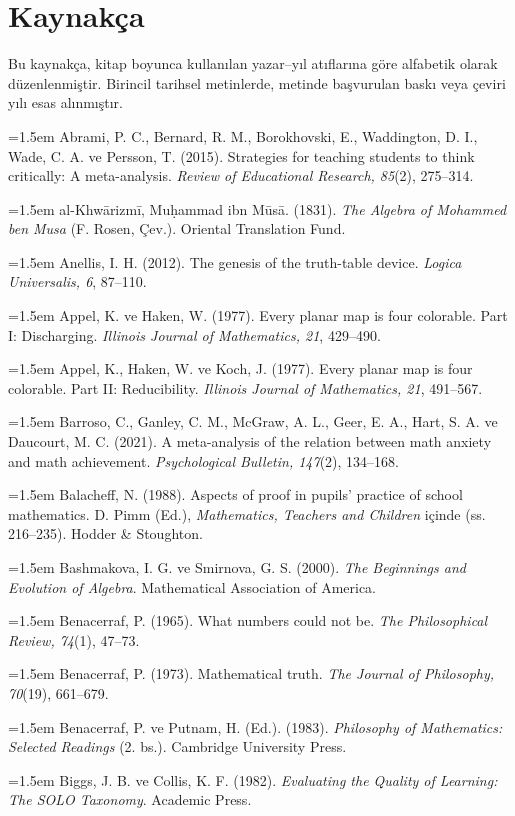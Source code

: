\chapter*{Kaynakça}

Bu kaynakça, kitap boyunca kullanılan yazar--yıl atıflarına göre alfabetik olarak düzenlenmiştir. Birincil tarihsel metinlerde, metinde başvurulan baskı veya çeviri yılı esas alınmıştır.

\begingroup
\small
\newcommand{\refentry}[1]{\par\noindent\hangindent=1.5em #1\par\smallskip}

\refentry{Abrami, P. C., Bernard, R. M., Borokhovski, E., Waddington, D. I., Wade, C. A. ve Persson, T. (2015). Strategies for teaching students to think critically: A meta-analysis. \emph{Review of Educational Research, 85}(2), 275--314.}
\refentry{al-Khwārizmī, Muḥammad ibn Mūsā. (1831). \emph{The Algebra of Mohammed ben Musa} (F. Rosen, Çev.). Oriental Translation Fund.}
\refentry{Anellis, I. H. (2012). The genesis of the truth-table device. \emph{Logica Universalis, 6}, 87--110.}
\refentry{Appel, K. ve Haken, W. (1977). Every planar map is four colorable. Part I: Discharging. \emph{Illinois Journal of Mathematics, 21}, 429--490.}
\refentry{Appel, K., Haken, W. ve Koch, J. (1977). Every planar map is four colorable. Part II: Reducibility. \emph{Illinois Journal of Mathematics, 21}, 491--567.}
\refentry{Barroso, C., Ganley, C. M., McGraw, A. L., Geer, E. A., Hart, S. A. ve Daucourt, M. C. (2021). A meta-analysis of the relation between math anxiety and math achievement. \emph{Psychological Bulletin, 147}(2), 134--168.}
\refentry{Balacheff, N. (1988). Aspects of proof in pupils' practice of school mathematics. D. Pimm (Ed.), \emph{Mathematics, Teachers and Children} içinde (ss. 216--235). Hodder \& Stoughton.}
\refentry{Bashmakova, I. G. ve Smirnova, G. S. (2000). \emph{The Beginnings and Evolution of Algebra}. Mathematical Association of America.}
\refentry{Benacerraf, P. (1965). What numbers could not be. \emph{The Philosophical Review, 74}(1), 47--73.}
\refentry{Benacerraf, P. (1973). Mathematical truth. \emph{The Journal of Philosophy, 70}(19), 661--679.}
\refentry{Benacerraf, P. ve Putnam, H. (Ed.). (1983). \emph{Philosophy of Mathematics: Selected Readings} (2. bs.). Cambridge University Press.}
\refentry{Biggs, J. B. ve Collis, K. F. (1982). \emph{Evaluating the Quality of Learning: The SOLO Taxonomy}. Academic Press.}
